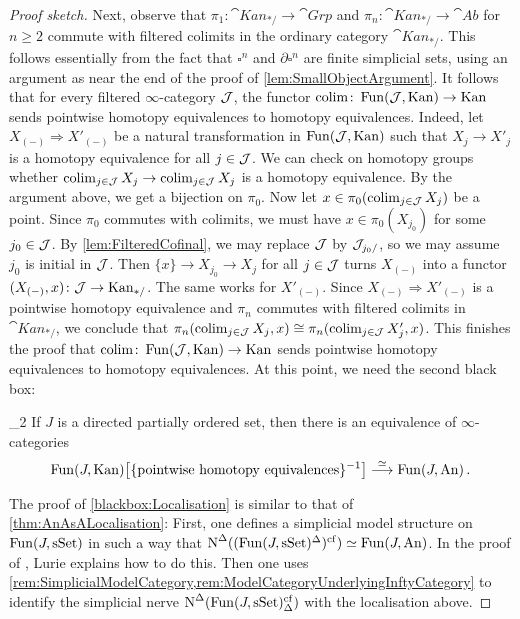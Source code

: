 \begin{proof}[Proof sketch]
	Next, observe that $\pi_1\colon \cat{Kan}_{*/}\rightarrow\cat{Grp}$ and $\pi_n\colon \cat{Kan}_{*/}\rightarrow \cat{Ab}$ for $n\geqslant 2$ commute with filtered colimits in the ordinary category $\cat{Kan}_{*/}$. This follows essentially from the fact that $\square^n$ and $\partial\square^n$ are finite simplicial sets, using an argument as near the end of the proof of \cref{lem:SmallObjectArgument}. It follows that for every filtered $\infty$-category $\mathcal{J}$, the functor $\operatorname*{colim}\colon \operatorname{Fun}(\mathcal{J},\mathrm{Kan})\rightarrow\mathrm{Kan}$ sends pointwise homotopy equivalences to homotopy equivalences. Indeed, let $X_{(-)}\Rightarrow X'_{(-)}$ be a natural transformation in $\operatorname{Fun}(\mathcal{J},\mathrm{Kan})$ such that $X_j\rightarrow X'_j$ is a homotopy equivalence for all $j\in\mathcal{J}$. We can check on homotopy groups whether $\operatorname*{colim}_{j\in\mathcal{J}}X_j\rightarrow\operatorname*{colim}_{j\in\mathcal{J}}X_j$ is a homotopy equivalence. By the argument above, we get a bijection on $\pi_0$. Now let $x\in \pi_0(\operatorname*{colim}_{j\in\mathcal{J}}X_j)$ be a point. Since $\pi_0$ commutes with colimits, we must have $x\in \pi_0(X_{j_0})$ for some $j_0\in \mathcal{J}$. By \cref{lem:FilteredCofinal}, we may replace $\mathcal{J}$ by $\mathcal{J}_{j_0/}$, so we may assume $j_0$ is initial in $\mathcal{J}$. Then $\{x\}\rightarrow X_{j_0}\rightarrow X_j$ for all $j\in \mathcal{J}$ turns $X_{(-)}$ into a functor $(X_{(-)},x)\colon \mathcal{J}\rightarrow\mathrm{Kan}_{*/}$. The same works for $X'_{(-)}$. Since $X_{(-)}\Rightarrow X'_{(-)}$ is a pointwise homotopy equivalence and $\pi_n$ commutes with filtered colimits in $\cat{Kan}_{*/}$, we conclude that $\pi_n(\operatorname*{colim}_{j\in\mathcal{J}}X_j,x)\cong \pi_n(\operatorname*{colim}_{j\in\mathcal{J}}X_j',x)$. This finishes the proof that $\operatorname*{colim}\colon \operatorname{Fun}(\mathcal{J},\mathrm{Kan})\rightarrow\mathrm{Kan}$ sends pointwise homotopy equivalences to homotopy equivalences. At this point, we need the second black box:
	\begin{alphanumerate}\itshape
		\item[\blacksquare_2] If $J$ is a directed partially ordered set, then there is an equivalence of $\infty$-categories\label{blackbox:Localisation}
		\begin{equation*}
			\Fun(J,\cat{Kan})\left[\{\text{pointwise homotopy equivalences}\}^{-1}\right]\overset{\simeq}{\longrightarrow}\Fun(J,\cat{An})\,.
		\end{equation*}
	\end{alphanumerate}
	The proof of \cref{blackbox:Localisation} is similar to that of \cref{thm:AnAsALocalisation}: First, one defines a simplicial model structure on $\operatorname{Fun}(J,\mathrm{sSet})$ in such a way that $\operatorname{N}^\Delta((\operatorname{Fun}(J,\mathrm{sSet})^\Delta)^\mathrm{cf})\simeq \operatorname{Fun}(J,\mathrm{An})$.  
	In the proof of \cite[Proposition~]{HTT}, Lurie explains how to do this. Then one uses \cref{rem:SimplicialModelCategory,rem:ModelCategoryUnderlyingInftyCategory} to identify the simplicial nerve $\operatorname{N}^\Delta(\operatorname{Fun}(J,\mathrm{sSet})_\Delta^\mathrm{cf})$ with the localisation above.
	

\end{proof}
